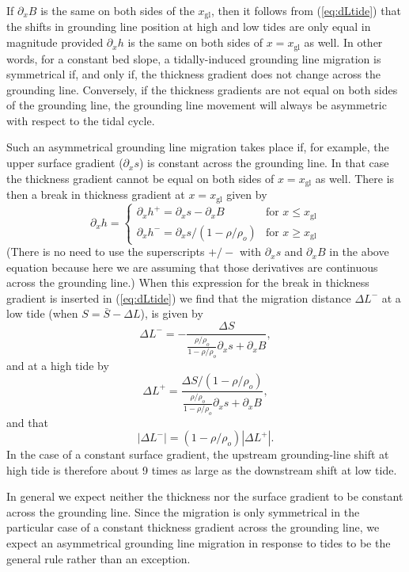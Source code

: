 \documentclass[10pt,a4paper]{book}
\newcommand{\p}{\partial}
\newcommand{\xgl}{x_{\mathrm{gl}}}
\begin{document}
If $\p_x B$ is the same on both sides of the $\xgl$, then it follows
from (\ref{eq:dLtide}) that the shifts in grounding line position at
high and low tides are only equal in magnitude provided $\p_x h$ is
the same on both sides of $x=\xgl$ as well. In other words, for a
constant bed slope, a tidally-induced grounding line migration is
symmetrical if, and only if, the thickness gradient does not change
across the grounding line. Conversely, if the thickness
gradients are not equal on both sides of the grounding line, the
grounding line movement will always be asymmetric with respect to the tidal
cycle.

Such an asymmetrical grounding line migration takes place if,
for example, the upper surface gradient ($\p_x s$) is constant across
the grounding line. In that case the thickness gradient cannot be
equal on both sides of $x=\xgl$ as well.  There is then a break in
thickness gradient at $x=\xgl$ given by
\[
\p_x h= \begin{cases} \p_x h^{+}=\p_x s - \p_x B & \text{for } x \leq \xgl \\
                      \p_x h^{-}=\p_x s/(1-\rho/\rho_o) & \text{for } x \geq \xgl
        \end{cases} 
\]
(There is no need to use the superscripts $+/-$ with $\p_x s$ and
$\p_x B$ in the above equation because here we are assuming that those
derivatives are continuous across the grounding line.)  When this
expression for the break in thickness gradient is inserted in
(\ref{eq:dLtide}) we find that the migration distance $\Delta L^{-}$
at a low tide (when $S=\bar{S}-\Delta L$), is given by
\[
\Delta L^{-} = - \frac{\Delta S}{\frac{\rho/\rho_o}{1-\rho/\rho_o} \p_x s + \p_x B} ,
\]
and at a high tide by
\[
\Delta L^{+} = \frac{\Delta S/(1-\rho/\rho_o) }{\frac{\rho/\rho_o}{1-\rho/\rho_o} \p_x s + \p_x B} ,
\]
and that
\[
|\Delta L^{-}| = (1-\rho/\rho_o) | \Delta L^{+}| .
\] 
In the case of a constant surface gradient, the upstream
grounding-line shift at high tide is therefore about 9 times as large
as the downstream shift at low tide.



In general we expect neither the thickness nor the surface gradient to
be constant across the grounding line. Since the migration is only
symmetrical in the particular case of a constant thickness gradient
across the grounding line, we expect an asymmetrical grounding line
migration in response to tides to be the general rule rather than an exception.
\end{document}
